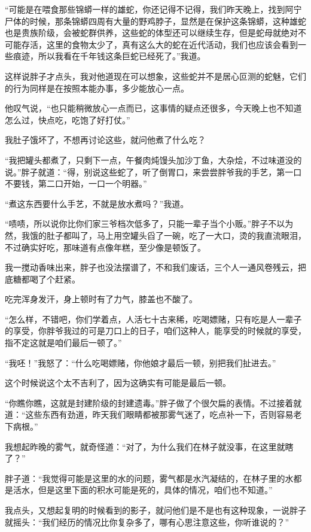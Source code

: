 “可能是在喂食那些锦蟒一样的雄蛇，你还记得不记得，我们昨天晚上，找到阿宁尸体的时候，那条锦蟒四周有大量的野鸡脖子，显然是在保护这条锦蟒，这种雄蛇也是贵族阶级，会被蛇群供养，这些蛇的体型还可以继续生存，但是蛇母就绝对不可能存活，这里的食物太少了，真有这么大的蛇在近代活动，我们也应该会看到一些痕迹，所以我看在千年钱这条巨蛇已经死了。”我道。

这样说胖子才点头，我对他道现在可以想象，这些蛇并不是居心叵测的蛇魅，它们的行为同样是在按照本能办事，多少能放心一点。

他叹气说，“也只能稍微放心一点而已，这事情的疑点还很多，今天晚上也不知道怎么过，快点吃，吃饱了好打仗。”

我肚子饿坏了，不想再讨论这些，就问他煮了什么吃？

“我把罐头都煮了，只剩下一点，午餐肉炖馒头加沙丁鱼，大杂烩，不过味道没的说。”胖子就道：“得，别说这些蛇了，听了倒胃口，来尝尝胖爷我的手艺，第一口不要钱，第二口开始，一口一个明器。”

“煮这东西要什么手艺，不就是放水煮吗？”我道。

“啧啧，所以说你比你们家三爷档次低多了，只能一辈子当个小贩。”胖子不以为然，我饿的肚子都叫了，马上用空罐头舀了一碗，吃了一大口，烫的我直流眼泪，不过确实好吃，那味道有点像年糕，至少像是顿饭了。

我一搅动香味出来，胖子也没法摆谱了，不和我们废话，三个人一通风卷残云，把底糖都喝了个赶紧。

吃完浑身发汗，身上顿时有了力气，膝盖也不酸了。

“怎么样，不错吧，你们学着点，人活七十古来稀，吃喝嫖赌，只有吃是人一辈子的享受，你胖爷我过的可是刀口上的日子，咱们这种人，能享受的时候就的享受，指不定这就是咱们最后一顿了。”

“我呸！”我怒了：“什么吃喝嫖赌，你他娘才最后一顿，别把我们扯进去。”

这个时候说这个太不吉利了，因为这确实有可能是最后一顿。

“你瞧你瞧，这就是封建阶级的封建遗毒。”胖子做了个很欠扁的表情。不过接着就道：“这些东西有劲道，昨天我们眼睛都被那雾气迷了，吃点补一下，否则容易老下病根。”

我想起昨晚的雾气，就奇怪道：“对了，为什么我们在林子就没事，在这里就瞎了？”

胖子道：“我觉得可能是这里的水的问题，雾气都是水汽凝结的，在林子里的水都是活水，但是这里下面的积水可能是死的，具体的情况，咱们也不知道。”

我点头，又想起复明的时候看到的影子，就问他们是不是也有这种现象，一说胖子就摇头：“我们经历的情况比你复杂多了，哪有心思注意这些，你听谁说的？”

